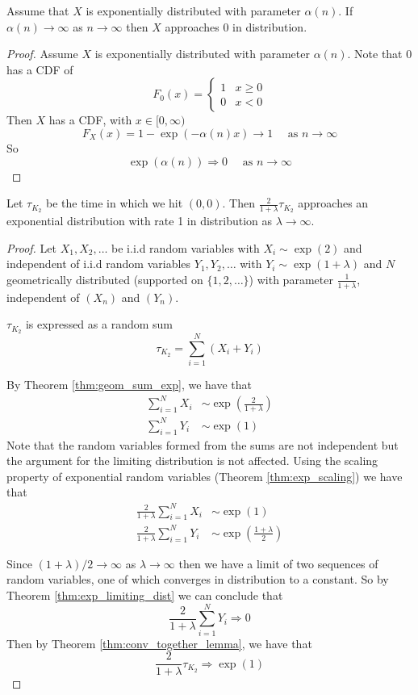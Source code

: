 \begin{theorem}\label{thm:exp_limiting_dist}
Assume that $X$ is exponentially distributed with parameter $\alpha(n)$.
If $\alpha(n) \to \infty$ as $n \to \infty$ then $X$ approaches 0 in distribution.
\end{theorem}

\begin{proof}
Assume $X$ is exponentially distributed with parameter $\alpha(n)$.
Note that 0 has a CDF of
$$
F_0(x) = \begin{cases}
    1 & x \geq 0\\
    0 & x < 0
\end{cases}
$$
Then $X$ has a CDF, with $x \in [0, \infty)$
$$
F_X(x) = 1 - \exp(-\alpha(n) x) \to 1 \quad \text{ as } n \to \infty
$$
So
$$
\exp(\alpha(n)) \Rightarrow 0 \quad \text{ as } n \to \infty
$$
\end{proof}

\begin{theorem}
Let $\tau_{K_2}$ be the time in which we hit $(0,0)$.
Then $\frac{2}{1 + \lambda} \tau_{K_2}$ approaches an exponential distribution with rate 1 in distribution as $\lambda \to \infty$.
\end{theorem}

\begin{proof}
Let $X_1, X_2, \ldots$ be i.i.d random variables with
$X_i \sim \exp(2)$ and independent of i.i.d random variables $Y_1, Y_2, \ldots$ with  $Y_i \sim \exp(1 + \lambda)$ and
$N$ geometrically distributed (supported on $\{1,2,\ldots\}$) with parameter $\frac{1}{1 + \lambda}$, independent of $(X_n)$ and $(Y_n)$.

$\tau_{K_2}$ is expressed as a random sum
$$
\tau_{K_2} = \sum_{i = 1}^N (X_i + Y_i)
$$

By Theorem \ref{thm:geom_sum_exp}, we have that
\begin{align*}
    \sum_{i = 1}^N X_i &\sim \exp\left( \frac{2}{1 + \lambda} \right)\\
    \sum_{i = 1}^N Y_i &\sim \exp( 1 )
\end{align*}
Note that the random variables formed from the sums are not independent but the argument for the limiting distribution is not affected.
Using the scaling property of exponential random variables (Theorem \ref{thm:exp_scaling}) we have that
\begin{align*}
    \frac{2}{1 + \lambda}\sum_{i = 1}^N X_i &\sim \exp( 1 )\\
    \frac{2}{1 + \lambda}\sum_{i = 1}^N Y_i &\sim \exp \left( \frac{1 + \lambda}{2} \right)
\end{align*}

Since $(1 + \lambda)/2 \to \infty$ as $\lambda \to \infty$ then we have a limit of two sequences of random variables, one of which converges in distribution to a constant. So by Theorem \ref{thm:exp_limiting_dist} we can conclude that
$$
\frac{2}{1 + \lambda}\sum_{i = 1}^N Y_i \Rightarrow 0
$$
Then by Theorem \ref{thm:conv_together_lemma}, we have that
$$
\frac{2}{1 + \lambda} \tau_{K_2} \Rightarrow \exp(1)
$$
\end{proof}

